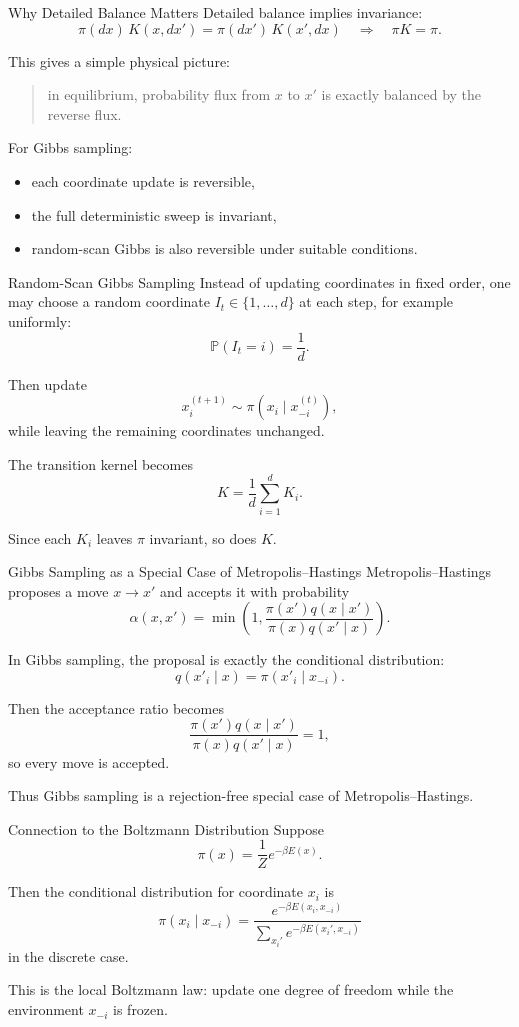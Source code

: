 \documentclass[aspectratio=169]{beamer}
\begin{document}
\begin{frame}{Why Detailed Balance Matters}
Detailed balance implies invariance:
\[
\pi(dx)\,K(x,dx')=\pi(dx')\,K(x',dx)
\quad \Longrightarrow \quad
\pi K = \pi.
\]

This gives a simple physical picture:
\begin{quote}
in equilibrium, probability flux from \(x\) to \(x'\) is exactly balanced by the reverse flux.
\end{quote}

For Gibbs sampling:
\begin{itemize}
    \item each coordinate update is reversible,
    \item the full deterministic sweep is invariant,
    \item random-scan Gibbs is also reversible under suitable conditions.
\end{itemize}
\end{frame}

\begin{frame}{Random-Scan Gibbs Sampling}
Instead of updating coordinates in fixed order, one may choose a random coordinate \(I_t\in\{1,\dots,d\}\) at each step, for example uniformly:
\[
\mathbb{P}(I_t=i)=\frac{1}{d}.
\]

Then update
\[
x^{(t+1)}_i \sim \pi(x_i \mid x^{(t)}_{-i}),
\]
while leaving the remaining coordinates unchanged.

The transition kernel becomes
\[
K=\frac{1}{d}\sum_{i=1}^d K_i.
\]

Since each \(K_i\) leaves \(\pi\) invariant, so does \(K\).
\end{frame}

\begin{frame}{Gibbs Sampling as a Special Case of Metropolis--Hastings}
Metropolis--Hastings proposes a move \(x\to x'\) and accepts it with probability
\[
\alpha(x,x')=\min\left(1,\frac{\pi(x')q(x\mid x')}{\pi(x)q(x'\mid x)}\right).
\]

In Gibbs sampling, the proposal is exactly the conditional distribution:
\[
q(x'_i\mid x)=\pi(x'_i\mid x_{-i}).
\]

Then the acceptance ratio becomes
\[
\frac{\pi(x')q(x\mid x')}{\pi(x)q(x'\mid x)}=1,
\]
so every move is accepted.

Thus Gibbs sampling is a rejection-free special case of Metropolis--Hastings.
\end{frame}

\begin{frame}{Connection to the Boltzmann Distribution}
Suppose
\[
\pi(x)=\frac{1}{Z}e^{-\beta E(x)}.
\]

Then the conditional distribution for coordinate \(x_i\) is
\[
\pi(x_i\mid x_{-i})
=
\frac{e^{-\beta E(x_i,x_{-i})}}
{\sum_{x_i'} e^{-\beta E(x_i',x_{-i})}}
\]
in the discrete case.

This is the local Boltzmann law: update one degree of freedom while the environment \(x_{-i}\) is frozen.
\end{frame}
\end{document}

